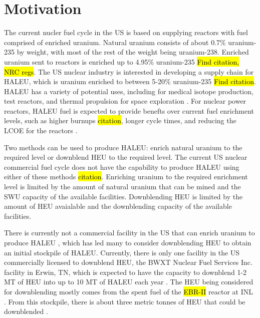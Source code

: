 \section{Motivation}
The current nucler fuel cycle in the US is based on supplying reactors 
with fuel comprised of enriched uranium. Natural uranium consists of 
about 0.7\% uranium-235 by weight, with most of the rest of the weight being 
uranium-238. Enriched uranium sent to reactors is enriched up to 4.95\% 
uranium-235 \hl{Find citation, NRC regs}. The US nuclear industry is 
interested in developing a supply chain for \gls{HALEU}, which is 
uranium enriched to between 5-20\% uranium-235 \hl{Find citation}. \gls{HALEU}
has a variety of potential uses, including for medical isotope production,
test reactors, and thermal propulsion for space exploration \cite{nagley_ha-leu_2020}.
For nuclear power reactors, \gls{HALEU} fuel is expected to provide benefts 
over current fuel enrichment levels, such as higher burnups \hl{citation},
longer cycle times, and 
reducing the \gls{LCOE} for the reactors \cite{carlson_economic_2020}.

Two methods can be used to produce \gls{HALEU}: enrich natural uranium to the 
required level or downblend \gls{HEU} to the required level. The current US
nuclear commercial fuel cycle does not have the capability to produce 
\gls{HALEU} using either of these methods \hl{citation}. Enriching uranium 
to the required enrichment level is limited by the amount of natural uranium 
that can be mined and the \gls{SWU} capacity of the available facilities. 
Downblending \gls{HEU} is limited by the amount of \gls{HEU} avaialable and 
the downblending capacity of the available facilities. 

There is currently not a commercial facility in the US that can enrich 
uranium to produce \gls{HALEU} \cite{hussain_nei_2018}, which has led 
many to consider downblending \gls{HEU} to obtain an initial stockpile of 
\gls{HALEU}. 
Currently, there is only one facility in the US commercially licensed to 
downblend \gls{HEU}, the BWXT Nuclear Fuel Services Inc. facility in 
Erwin, TN, which is expected to have the capacity to downblend 1-2 
MT of \gls{HEU} into up to 10 MT of \gls{HALEU} each year \cite{nagley_ha-leu_2020}.
The \gls{HEU} being considered for downblending mostly comes from the spent 
fuel of the \hl{EBR-II} reactor at \gls{INL} \cite{patterson_haleu_2019}. From 
this stockpile, there is about three metric tonnes of \gls{HEU} that 
could be downblended \cite{patterson_haleu_2019}.




